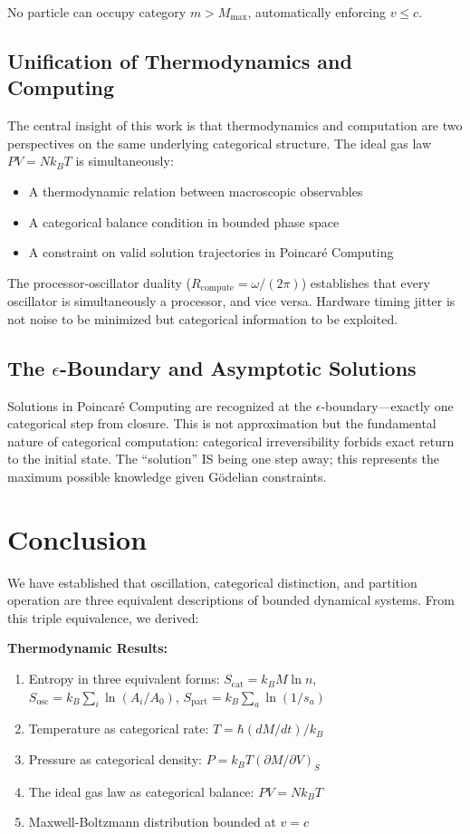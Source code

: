 \documentclass[twocolumn,10pt]{article}
\theoremstyle{plain}
\theoremstyle{definition}
\theoremstyle{remark}
\begin{document}
No particle can occupy category $m > M_{\max}$, automatically enforcing $v \leq c$.

\subsection{Unification of Thermodynamics and Computing}

The central insight of this work is that thermodynamics and computation are two perspectives on the same underlying categorical structure. The ideal gas law $PV = Nk_BT$ is simultaneously:
\begin{itemize}
    \item A thermodynamic relation between macroscopic observables
    \item A categorical balance condition in bounded phase space
    \item A constraint on valid solution trajectories in Poincar\'e Computing
\end{itemize}

The processor-oscillator duality ($R_{\text{compute}} = \omega/(2\pi)$) establishes that every oscillator is simultaneously a processor, and vice versa. Hardware timing jitter is not noise to be minimized but categorical information to be exploited.

\subsection{The $\epsilon$-Boundary and Asymptotic Solutions}

Solutions in Poincar\'e Computing are recognized at the $\epsilon$-boundary---exactly one categorical step from closure. This is not approximation but the fundamental nature of categorical computation: categorical irreversibility forbids exact return to the initial state. The ``solution'' IS being one step away; this represents the maximum possible knowledge given G\"odelian constraints.

\section{Conclusion}
\label{sec:conclusion}

We have established that oscillation, categorical distinction, and partition operation are three equivalent descriptions of bounded dynamical systems. From this triple equivalence, we derived:

\textbf{Thermodynamic Results:}
\begin{enumerate}
    \item Entropy in three equivalent forms: $S_{\text{cat}} = k_B M \ln n$, $S_{\text{osc}} = k_B \sum_i \ln(A_i/A_0)$, $S_{\text{part}} = k_B \sum_a \ln(1/s_a)$
    \item Temperature as categorical rate: $T = \hbar(dM/dt)/k_B$
    \item Pressure as categorical density: $P = k_BT(\partial M/\partial V)_S$
    \item The ideal gas law as categorical balance: $PV = Nk_BT$
    \item Maxwell-Boltzmann distribution bounded at $v = c$
\end{enumerate}
\end{document}
